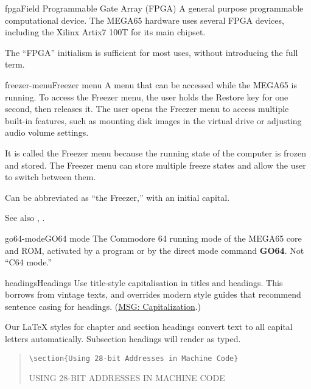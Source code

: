\begin{sgentry}{fpga}{Field Programmable Gate Array (FPGA)}
    A general purpose programmable computational device. The MEGA65 hardware uses several FPGA devices, including the Xilinx Artix7 100T for its main chipset.

    The ``FPGA'' initialism is sufficient for most uses, without introducing the full term.
\end{sgentry}

\begin{sgentry}{freezer-menu}{Freezer menu}
    A menu that can be accessed while the MEGA65 is running. To access the Freezer menu, the user holds the Restore key for one second, then releases it. The user opens the Freezer menu to access multiple built-in features, such as mounting disk images in the virtual drive or adjusting audio volume settings.

    It is called the Freezer menu because the running state of the computer is frozen and stored. The Freezer menu can store multiple freeze states and allow the user to switch between them.

    Can be abbreviated as ``the Freezer,'' with an initial capital.

    See also , .
\end{sgentry}

\begin{sgentry}{go64-mode}{GO64 mode}
    The Commodore 64 running mode of the MEGA65 core and ROM, activated by a program or by the direct mode command \textbf{GO64}. Not ``C64 mode.''
\end{sgentry}

\begin{sgentry}{headings}{Headings}
    Use title-style capitalisation in titles and headings. This borrows from vintage texts, and overrides modern style guides that recommend sentence casing for headings. (\href{https://learn.microsoft.com/en-us/style-guide/capitalization}{MSG: Capitalization}.)

    Our LaTeX styles for chapter and section headings convert text to all capital letters automatically. Subsection headings will render as typed.

    \begin{quote}
        \texttt{{\textbackslash}section\{Using 28-bit Addresses in Machine Code\}}

        \hrulefill

        {\large USING 28-BIT ADDRESSES IN MACHINE CODE}
    \end{quote}
\end{sgentry}

